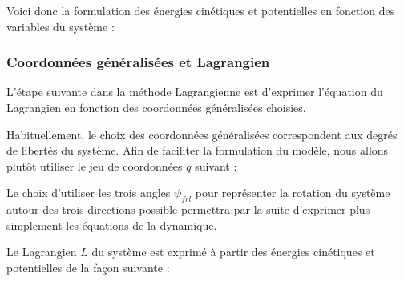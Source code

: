 				
					Voici donc la formulation des énergies cinétiques et potentielles en fonction des variables du système :
					
					
			
			\subsubsection{Coordonnées généralisées et Lagrangien}
			
				L'étape suivante dans la méthode Lagrangienne est d'exprimer l'équation du Lagrangien en fonction des coordonnées généralisées choisies.
				
				Habituellement, le choix des coordonnées généralisées correspondent aux degrés de libertés du système. 
				Afin de faciliter la formulation du modèle, nous allons plutôt utiliser le jeu de coordonnées $q$ suivant :
				
				Le choix d'utiliser les trois angles $\psi_{frl}$ pour représenter la rotation du système autour des trois directions possible permettra par la suite d'exprimer plus simplement les équations de la dynamique.
				
				Le Lagrangien $L$ du système est exprimé à partir des énergies cinétiques et potentielles de la façon suivante :
				
